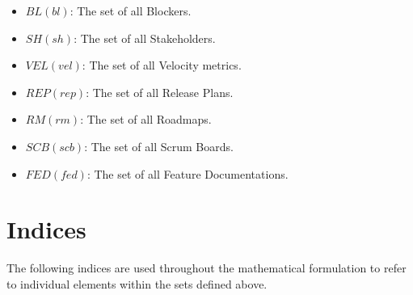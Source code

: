 \documentclass[11pt]{article}
\begin{document}
\begin{itemize}
    \item $BL (bl)$: The set of all Blockers.
    \item $SH (sh)$: The set of all Stakeholders.
    \item $VEL (vel)$: The set of all Velocity metrics.
    \item $REP (rep)$: The set of all Release Plans.
    \item $RM (rm)$: The set of all Roadmaps.
    \item $SCB (scb)$: The set of all Scrum Boards.
    \item $FED (fed)$: The set of all Feature Documentations.
\end{itemize}

\section{Indices}
The following indices are used throughout the mathematical formulation to refer to individual elements within the sets defined above.
\end{document}
